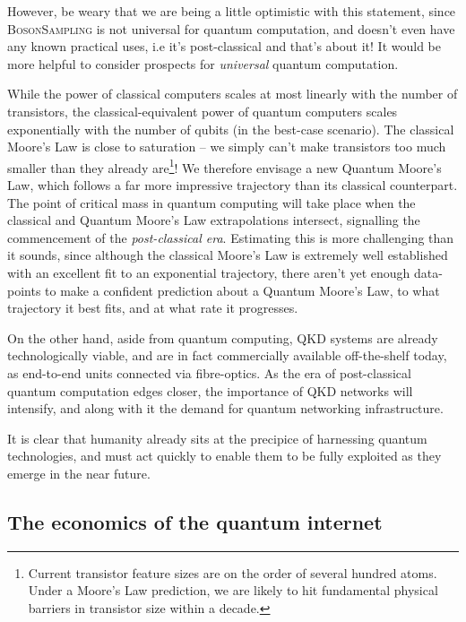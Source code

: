 \documentclass[aps, rmp, twocolumn, amsmath, amssymb, nofootinbib, superscriptaddress, longbibliography, floatfix, table-of-contents, eqsecnum]{revtex4-1}
\begin{document}
However, be weary that we are being a little optimistic with this statement, since \textsc{BosonSampling} is not universal for quantum computation, and doesn't even have any known practical uses, i.e it's post-classical and that's about it! It would be more helpful to consider prospects for \textit{universal} quantum computation.

While the power of classical computers scales at most linearly with the number of transistors, the classical-equivalent power of quantum computers scales exponentially with the number of qubits (in the best-case scenario). The classical Moore's Law is close to saturation -- we simply can't make transistors too much smaller than they already are\footnote{Current transistor feature sizes are on the order of several hundred atoms. Under a Moore's Law prediction, we are likely to hit fundamental physical barriers in transistor size within a decade.}! We therefore envisage a new Quantum Moore's Law, which follows a far more impressive trajectory than its classical counterpart. The point of critical mass in quantum computing will take place when the classical and Quantum Moore's Law extrapolations intersect, signalling the commencement of the \textit{post-classical era}. Estimating this is more challenging than it sounds, since although the classical Moore's Law is extremely well established with an excellent fit to an exponential trajectory, there aren't yet enough data-points to make a confident prediction about a Quantum Moore's Law, to what trajectory it best fits, and at what rate it progresses.

On the other hand, aside from quantum computing, QKD systems are already technologically viable, and are in fact commercially available off-the-shelf today, as end-to-end units connected via fibre-optics. As the era of post-classical quantum computation edges closer, the importance of QKD networks will intensify, and along with it the demand for quantum networking infrastructure.

It is clear that humanity already sits at the precipice of harnessing quantum technologies, and must act quickly to enable them to be fully exploited as they emerge in the near future.

%
%

\subsection{The economics of the quantum internet} \label{sec:economics} 
\end{document}
